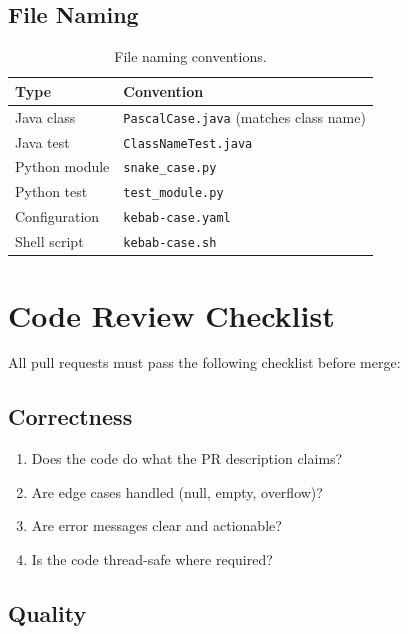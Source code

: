 \documentclass[
    language=english,
    doctype=standard,
    institution=none,
    titlestyle=book,
    oneside,
]{../../omnilatex}
\begin{document}
\section{File Naming}

\begin{table}[htbp]
    \centering
    \caption{File naming conventions.}
    \label{tab:file-naming}
    \begin{tabular}{@{}lp{8cm}@{}}
        \toprule
        Type & Convention \\
        \midrule
        Java class & \texttt{PascalCase.java} (matches class name) \\
        Java test & \texttt{ClassNameTest.java} \\
        Python module & \texttt{snake\_case.py} \\
        Python test & \texttt{test\_module.py} \\
        Configuration & \texttt{kebab-case.yaml} \\
        Shell script & \texttt{kebab-case.sh} \\
        \bottomrule
    \end{tabular}
\end{table}

\chapter{Code Review Checklist}
\label{sec:code-review}

All pull requests must pass the following checklist before merge:

\section{Correctness}

\begin{enumerate}
    \item Does the code do what the PR description claims?
    \item Are edge cases handled (null, empty, overflow)?
    \item Are error messages clear and actionable?
    \item Is the code thread-safe where required?
\end{enumerate}

\section{Quality}
\end{document}
